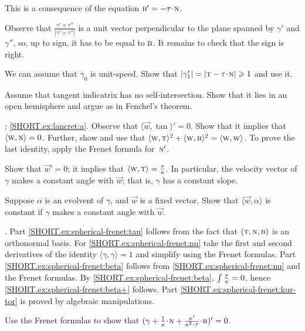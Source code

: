 \begin{multicols}{2}
This is a consequence of the equation $\bi' = - \tor\cdot \norm $.

Observe that $\tfrac{\gamma'\times\gamma''}{|\gamma'\times\gamma''|}$ is a unit vector perpendicular to the plane spanned by $\gamma'$ and $\gamma''$, so, up to sign, it has to be equal to $\text{\sc{b}}$.
It remains to check that the sign is right.

We can assume that $\gamma_0$ is unit-speed.
Show that
$|\gamma_1'|=|\tan-\tor\cdot \norm|\ge 1$ and use it.

 Assume that tangent indicatrix has no self-intersection.
Show that it lies in an open hemisphere and argue as in Fenchel's theorem.

\parbf{\ref{ex:lancret}}; \ref{SHORT.ex:lancret:a}.
Observe that 
$\langle \vec w,\tan\rangle'=0$.
Show that it implies that $\langle \text{\sc{w}}, \text{\sc{n}}\rangle =0$.
Further, show and use that $\langle \text{\sc{w}}, \text{\sc{t}}\rangle^2+\langle \text{\sc{w}}, \text{\sc{b}}\rangle^2=\langle \text{\sc{w}}, \text{\sc{w}}\rangle$.
To prove the last identity, apply the Frenet formula for~$\text{\sc{n}}'$.

Show that $\vec w'=0$;
it implies that $\langle \vec w,\tan\rangle\z=\tfrac\tor\kur$.
In particular, the velocity vector of $\gamma$ makes a constant angle with $\vec w$; that is, $\gamma$ has a constant slope.

Suppose $\alpha$ is an evolvent of $\gamma$, and $\vec w$ is a fixed vector.
Show that $\langle \vec w,\alpha\rangle$ is constant if $\gamma$ makes a constant angle with $\vec w$.

\parbf{\ref{ex:spherical-frenet}}.
Part \ref{SHORT.ex:spherical-frenet:tau} follows from the fact that $(  \text{\sc{t}},\text{\sc{n}},\text{\sc{b}})$ is an orthonormal basis.
For \ref{SHORT.ex:spherical-frenet:nu} take the first and second derivatives of the identity $\langle\gamma,\gamma\rangle=1$ and simplify using the Frenet formulas.
Part \ref{SHORT.ex:spherical-frenet:beta} follows from \ref{SHORT.ex:spherical-frenet:nu} and the Frenet formulas.
By \ref{SHORT.ex:spherical-frenet:beta}, $\int\tfrac{\tau}{\kappa}=0$, hence \ref{SHORT.ex:spherical-frenet:beta+} follows.
Part \ref{SHORT.ex:spherical-frenet:kur-tor} is proved by algebraic manipulations.

Use the Frenet formulas to show that $(\gamma+\tfrac1\kur\cdot \norm+\tfrac{\kur'}{\kur^2\cdot\tor}\cdot\bi)'=0$.




\end{multicols}
